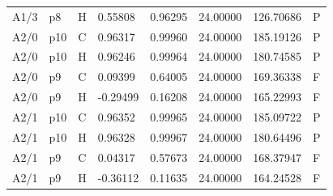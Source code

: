 \begin{longtable}{llllllll}
A1/3 & p8 & H & 0.55808 & 0.96295 & 24.00000 & 126.70686 & P \\
A2/0 & p10 & C & 0.96317 & 0.99960 & 24.00000 & 185.19126 & P \\
A2/0 & p10 & H & 0.96246 & 0.99964 & 24.00000 & 180.74585 & P \\
A2/0 & p9 & C & 0.09399 & 0.64005 & 24.00000 & 169.36338 & F \\
A2/0 & p9 & H & -0.29499 & 0.16208 & 24.00000 & 165.22993 & F \\
A2/1 & p10 & C & 0.96352 & 0.99965 & 24.00000 & 185.09722 & P \\
A2/1 & p10 & H & 0.96328 & 0.99967 & 24.00000 & 180.64496 & P \\
A2/1 & p9 & C & 0.04317 & 0.57673 & 24.00000 & 168.37947 & F \\
A2/1 & p9 & H & -0.36112 & 0.11635 & 24.00000 & 164.24528 & F \\
\bottomrule
\end{longtable}
